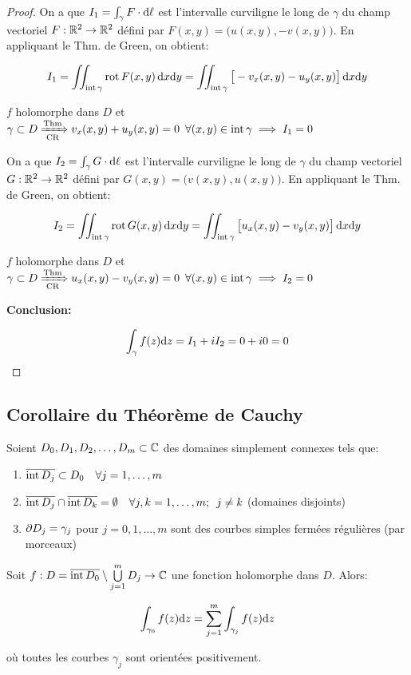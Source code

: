 \begin{proof}
    On a que $I_1 = \int_\gamma F \cdot \mathrm{d}\ell$ est l'intervalle curviligne le long de $\gamma$ du champ vectoriel $F: \mathbb{R}^2 \rightarrow \mathbb{R}^2$ défini par $F(x,y) = \big(u(x,y),-v(x,y)\big)$.
    En appliquant le Thm. de Green, on obtient:
    
    \[
    I_1 = \iint_{\textrm{int}\,\gamma} \textrm{rot}\, F(x,y) \, \mathrm{d}x\mathrm{d}y
    = \iint_{\textrm{int}\,\gamma} \big[-v_x(x,y) - u_y(x,y)\big] \, \mathrm{d}x\mathrm{d}y
    \]
    
    $f$ holomorphe dans $D$ et $\gamma \subset D \xRightarrow[\textrm{CR}]{\textrm{Thm}} v_x(x,y) + u_y(x,y) = 0 \enspace \forall(x,y) \in \textrm{int}\,\gamma \implies I_1 = 0$
    
    On a que $I_2 = \int_\gamma G \cdot \mathrm{d}\ell$ est l'intervalle curviligne le long de $\gamma$ du champ vectoriel $G: \mathbb{R}^2 \rightarrow \mathbb{R}^2$ défini par $G(x,y) = \big(v(x,y),u(x,y)\big)$.
    En appliquant le Thm. de Green, on obtient:
    
    \[
    I_2 = \iint_{\textrm{int}\,\gamma} \textrm{rot}\, G(x,y) \, \mathrm{d}x\mathrm{d}y
    = \iint_{\textrm{int}\,\gamma} \big[u_x(x,y) - v_y(x,y)\big] \, \mathrm{d}x\mathrm{d}y
    \]
    
    $f$ holomorphe dans $D$ et $\gamma \subset D \xRightarrow[\textrm{CR}]{\textrm{Thm}} u_x(x,y) - v_y(x,y) = 0 \enspace \forall(x,y) \in \textrm{int}\,\gamma \implies I_2 = 0$
    
    \textbf{Conclusion:}
    
    \[\int_\gamma f(z) \mathrm{d}z = I_1 + iI_2 = 0 + i0 = 0\]
\end{proof}

\subsection{Corollaire du Théorème de Cauchy}

\begin{corollary}
    Soient $D_0,D_1,D_2,\ldots,D_m \subset \mathbb{C}$ des domaines simplement connexes tels que:
    
    \begin{enumerate}[label=\arabic{enumi})]
    \item 
    $\overline{\textrm{int}\, D_j} \subset D_0 \quad \forall j = 1,\ldots,m$
    \item 
    $\overline{\textrm{int}\, D_j} \cap \overline{\textrm{int}\, D_k} = \emptyset \quad \forall j,k = 1,\ldots,m; \enspace j \neq k$ (domaines disjoints)
    \item 
    $\partial D_j = \gamma_j$ pour $j=0,1,\ldots,m$ sont des courbes simples fermées régulières (par morceaux)
    \end{enumerate}

    Soit $f: D = \overline{\textrm{int}\, D_0} \setminus \bigcup\limits_{j=1}^m D_j \rightarrow \mathbb{C}$ une fonction holomorphe dans $D$.
    Alors:
    
    \[
    \int_{\gamma_0} f(z) \mathrm{d}z = \sum_{j=1}^m \int_{\gamma_j} f(z) \mathrm{d}z
    \]
    
    où toutes les courbes $\gamma_j$ sont orientées positivement. %
\end{corollary}

